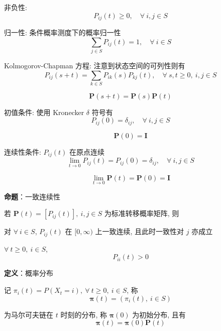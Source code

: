 \documentclass[openany]{ctexbook}
\theoremstyle{kaiti}
\theoremstyle{normal}
\begin{document}
非负性: 
\begin{equation}
  P_{ij}(t)\geqslant0,\quad\forall~i,j\in S
\end{equation}

归一性: 条件概率测度下的概率归一性
\begin{equation}
  \sum_{j\in S}P_{ij}(t)=1,\quad \forall~i\in S
\end{equation}

Kolmogorov-Chapman 方程: 注意到状态空间的可列性则有
\begin{equation}
  P_{ij}(s+t)=\sum_{k\in S}P_{ik}(s)P_{kj}(t),\quad\forall~s,t\geqslant0,~i,j\in S
\end{equation}

\begin{equation}
  \bm{P}(s+t)=\bm{P}(s)\bm{P}(t)
\end{equation}

初值条件: 使用 Kronecker $\delta$ 符号有
\begin{equation}
  P_{ij}(0)=\delta_{ij},\quad\forall~i,j\in S
\end{equation}

\begin{equation}
  \bm{P}(0)=\bm{I}
\end{equation}

连续性条件: $P_{ij}(t)$ 在原点连续
\begin{equation}
  \lim_{t\to0}P_{ij}(t)=P_{ij}(0)=\delta_{ij},\quad\forall~i,j\in S
\end{equation}

\begin{equation}
  \lim_{t\to0}\bm{P}(t)=\bm{P}(0)=\bm{I}
\end{equation}

\textbf{命题}：一致连续性

若 $\bm{P}(t)=[P_{ij}(t)],~i,j\in S$ 为标准转移概率矩阵, 则

对 $\forall~i\in S$, $P_{ij}(t)$ 在 $[0,\infty)$ 上一致连续, 且此时一致性对 $j$ 亦成立

$\forall~t\geqslant0,~i\in S$,
\begin{equation}
  P_{ii}(t)>0
\end{equation}


\textbf{定义}：概率分布

记 $\pi_i(t)=P(X_t=i),~\forall~t\geqslant0,~i\in S$, 称 
\begin{equation}
  \bm{\pi}(t)=(\pi_i(t),~i\in S)
\end{equation}

为马尔可夫链在 $t$ 时刻的分布, 称 $\bm{\pi}(0)$ 为初始分布, 且有
\begin{equation}
  \bm{\pi}(t)=\bm{\pi}(0)\bm{P}(t)
\end{equation}
\end{document}
